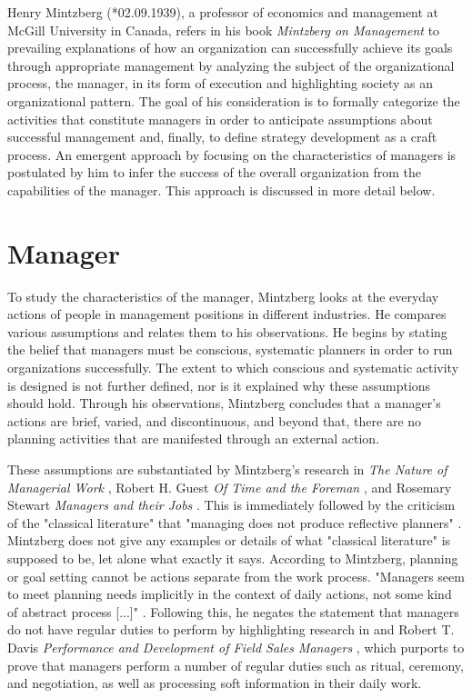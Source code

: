 \documentclass[a4paper,12pt]{article}
\begin{document}
Henry Mintzberg (*02.09.1939), a professor of economics and management at
McGill University in Canada, refers in his book \emph{Mintzberg on Management}
\cite{Mintzberg} to prevailing explanations of how an organization can
successfully achieve its goals through appropriate management by analyzing the
subject of the organizational process, the manager, in its form of execution
and highlighting society as an organizational pattern. The goal of his
consideration is to formally categorize the activities that constitute
managers in order to anticipate assumptions about successful management and,
finally, to define strategy development as a craft process. An emergent
approach by focusing on the characteristics of managers is postulated by him
to infer the success of the overall organization from the capabilities of the
manager. This approach is discussed in more detail below.

\section{Manager}

To study the characteristics of the manager, Mintzberg looks at the everyday
actions of people in management positions in different industries. He compares
various assumptions and relates them to his observations. He begins by stating
the belief that managers must be conscious, systematic planners in order to
run organizations successfully. The extent to which conscious and systematic
activity is designed is not further defined, nor is it explained why these
assumptions should hold. Through his observations, Mintzberg concludes that a
manager's actions are brief, varied, and discontinuous, and beyond that, there
are no planning activities that are manifested through an external action.

These assumptions are substantiated by Mintzberg's research in \emph{The
  Nature of Managerial Work} \cite{Mintzberg2}, Robert H. Guest \emph{Of Time
  and the Foreman} \cite{guest}, and Rosemary Stewart \emph{Managers and their
  Jobs} \cite{stewart}.  This is immediately followed by the criticism of the
"classical literature" that "managing does not produce reflective planners"
\cite[p.25]{Mintzberg}.  Mintzberg does not give any examples or details of
what "classical literature" is supposed to be, let alone what exactly it says.
According to Mintzberg, planning or goal setting cannot be actions separate
from the work process. "Managers seem to meet planning needs implicitly in the
context of daily actions, not some kind of abstract process [...]"
\cite[p.25]{Mintzberg}.  Following this, he negates the statement that
managers do not have regular duties to perform by highlighting research in
\cite{Mintzberg2} and Robert T. Davis \emph{Performance and Development of
  Field Sales Managers} \cite{davis}, which purports to prove that managers
perform a number of regular duties such as ritual, ceremony, and negotiation,
as well as processing soft information in their daily work.
\end{document}
